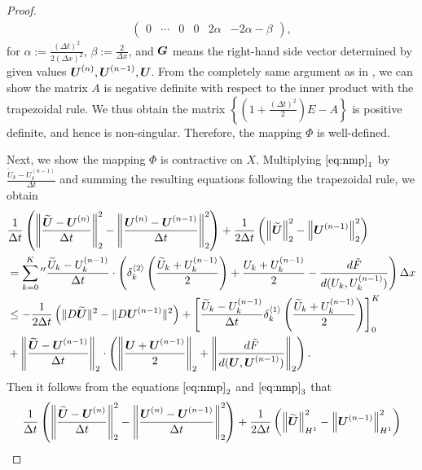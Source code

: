 \documentclass[dvipdfmx-if-dvi,autodetect-engine,ja=standard]{amsart}
\numberwithin{equation}{section} %
\def\vect#1{\mbox{\boldmath $#1$}} %
\begin{document}
\begin{proof}
\begin{align}
\begin{pmatrix}
    0&\cdots&0&0 &2 \alpha &-2 \alpha -\beta
    \end{pmatrix},
\end{align}
for $\alpha := \frac{(\Delta t)^2}{2(\Delta x)^2}$, $\beta := \frac{2}{\Delta x}$, 
and $\vect{G}$ means the right-hand side vector determined by given values $\vect{U}^{(n)}, \vect{U}^{(n-1)}, \vect{U}$. 
From the completely same argument as in \cite{5}, we can show the matrix $A$ is 
negative definite
with respect to the inner product with the trapezoidal rule. 
We thus obtain the matrix $\left\{ \left(1 + \frac{(\Delta t)^2}{2} \right) E - A \right\}$ is 
positive definite, and hence is non-singular. 
Therefore, the mapping $\Phi$ is well-defined. 

Next, we show the mapping $\Phi$ is contractive on $X$. 
Multiplying $\eqref{eq:nmp}_1$ by
$\frac{\widetilde{U}_k - U_k^{(n-1)}}{\Delta t}$ and 
summing the resulting equations following the trapezoidal rule, 
we obtain
\begin{align*}
&\frac{1}{\Delta t} \left( \left\| \frac{\widetilde{\vect{U}} -\vect{U}^{(n)}}{\Delta t} \right\|_2^2 - \left\| \frac{\vect{U}^{(n)} -\vect{U}^{(n-1)}}{\Delta t} \right\|_2^2 \right)
+ \frac{1}{2\Delta t} \left( \left\| \widetilde{\vect{U}} \right\|_2^2 - \left\| \vect{U}^{(n-1)} \right\|_2^2 \right) \\
&= \sum_{k=0}^K{}'' \frac{\widetilde{U}_k - U_k^{(n-1)}}{\Delta t} 
\cdot \left( \delta_k^{\langle 2 \rangle}
    \left(
        \frac{\widetilde{U}_k+U_k^{(n-1)}}{2}
    \right) + \frac{U_k+U_k^{(n-1)}}{2}
    -   \frac{d \tilde{F}}{d(U_k, U_k^{(n-1)})} \right) \Delta x \\
&\leq - \frac{1}{2\Delta t} \left( \| D \widetilde{\vect{U}} \|^2 - \| D \vect{U}^{(n-1)} \|^2 \right)   
+ \left[ \frac{\widetilde{U}_k - U_k^{(n-1)}}{\Delta t} \delta_k^{\langle 1 \rangle} \left( \frac{\widetilde{U}_k+U_k^{(n-1)}}{2} \right) \right]_0^K \\
&+ \left\| \frac{\widetilde{\vect{U}} -\vect{U}^{(n-1)}}{\Delta t} \right\|_2 
\cdot \left( \left\| \frac{\vect{U} + \vect{U}^{(n-1)}}{2} \right\|_2 + \left\|  \frac{d \tilde{F}}{d(\vect{U}, \vect{U}^{(n-1)})} \right\|_2 \right). 
\end{align*}
Then it follows from the equations $\eqref{eq:nmp}_2$ and $\eqref{eq:nmp}_3$ that 
\begin{align*}
&\frac{1}{\Delta t} \left( \left\| \frac{\widetilde{\vect{U}} -\vect{U}^{(n)}}{\Delta t} \right\|_2^2 - \left\| \frac{\vect{U}^{(n)} -\vect{U}^{(n-1)}}{\Delta t} \right\|_2^2 \right)
+ \frac{1}{2\Delta t} \left( \left\| \widetilde{\vect{U}} \right\|_{H^1}^2 - \left\| \vect{U}^{(n-1)} \right\|_{H^1}^2 \right) \\

\end{align*}
\end{proof}
\end{document}
